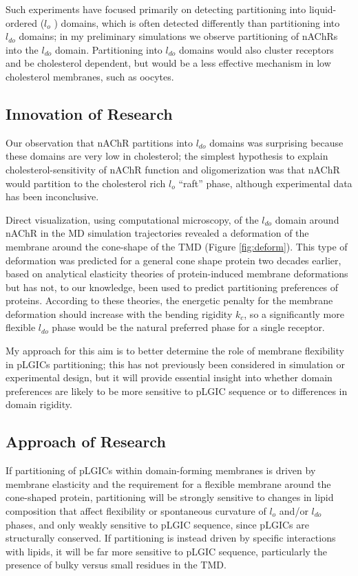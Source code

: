 \documentclass{article}
\begin{document}
Such experiments have focused primarily on detecting partitioning into liquid-ordered ($l_o$ ) domains, which is often detected differently than partitioning into $l_{do}$ domains; in my preliminary simulations we observe partitioning of nAChRs into the $l_{do}$ domain. Partitioning into $l_{do}$ domains would also cluster receptors and be cholesterol dependent, but would be a less effective mechanism in low cholesterol membranes, such as oocytes.

\subsection{Innovation of Research}

Our observation that nAChR partitions into $l_{do}$ domains was surprising because these domains are very low in cholesterol; the simplest hypothesis to explain cholesterol-sensitivity of nAChR function and oligomerization was that nAChR would partition to the cholesterol rich $l_o$ “raft” phase, although experimental data has been inconclusive.

Direct visualization, using computational microscopy, of the $l_{do}$ domain around nAChR in the MD simulation trajectories revealed a deformation of the membrane around the cone-shape of the TMD (Figure \ref{fig:deform}). This type of deformation was predicted for a general cone shape protein two decades earlier, based on analytical elasticity theories of protein-induced membrane deformations \cite{Goulian1996,Weikl1998} but has not, to our knowledge, been used to predict partitioning preferences of proteins. According to these theories, the energetic penalty for the membrane deformation should increase with the bending rigidity $k_c$, so a significantly more flexible $l_{do}$ phase would be the natural preferred phase for a single receptor.

My approach for this aim is to better determine the role of membrane flexibility in pLGICs partitioning; this has not previously been considered in simulation or experimental design, but it will provide essential insight into whether domain preferences are likely to be more sensitive to pLGIC sequence or to differences in domain rigidity.

\subsection{Approach of Research}

If partitioning of pLGICs within domain-forming membranes is driven by membrane elasticity and the requirement for a flexible membrane around the cone-shaped protein, partitioning will be strongly sensitive to changes in lipid composition that affect flexibility or spontaneous curvature of $l_o$ and/or $l_{do}$ phases, and only weakly sensitive to pLGIC sequence, since pLGICs are structurally conserved. If partitioning is instead driven by specific interactions with lipids, it will be far more sensitive to pLGIC sequence, particularly the presence of bulky versus small residues in the TMD. 
\end{document}
